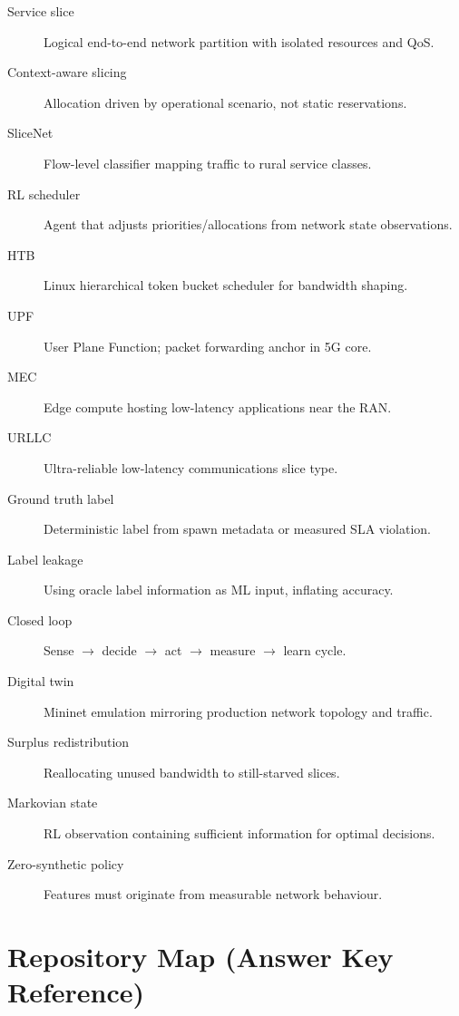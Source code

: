 \documentclass[11pt,a4paper]{article}
\begin{document}
\begin{description}
    \item[Service slice] Logical end-to-end network partition with isolated resources and QoS.
    \item[Context-aware slicing] Allocation driven by operational scenario, not static reservations.
    \item[SliceNet] Flow-level classifier mapping traffic to rural service classes.
    \item[RL scheduler] Agent that adjusts priorities/allocations from network state observations.
    \item[HTB] Linux hierarchical token bucket scheduler for bandwidth shaping.
    \item[UPF] User Plane Function; packet forwarding anchor in 5G core.
    \item[MEC] Edge compute hosting low-latency applications near the RAN.
    \item[URLLC] Ultra-reliable low-latency communications slice type.
    \item[Ground truth label] Deterministic label from spawn metadata or measured SLA violation.
    \item[Label leakage] Using oracle label information as ML input, inflating accuracy.
    \item[Closed loop] Sense $\rightarrow$ decide $\rightarrow$ act $\rightarrow$ measure $\rightarrow$ learn cycle.
    \item[Digital twin] Mininet emulation mirroring production network topology and traffic.
    \item[Surplus redistribution] Reallocating unused bandwidth to still-starved slices.
    \item[Markovian state] RL observation containing sufficient information for optimal decisions.
    \item[Zero-synthetic policy] Features must originate from measurable network behaviour.
\end{description}

\section{Repository Map (Answer Key Reference)}
\end{document}
